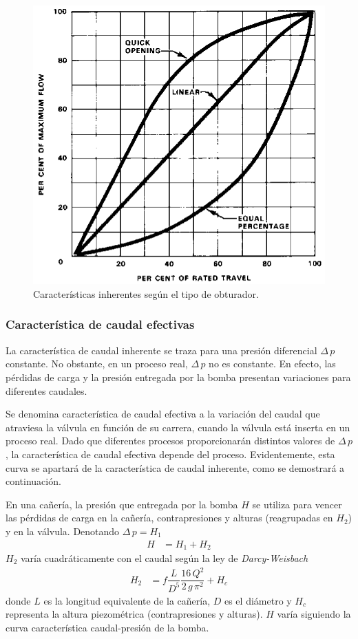 \begin{figure}
 \centering
 \includegraphics[scale=1.5]{Cap2-DisenoEnsamblado/images/Inherente.png}
 \caption{Características inherentes según el tipo de obturador.}
 \label{fig:caractInherente}
\end{figure}


\subsubsection{Característica de caudal efectivas}

La característica de caudal inherente se traza para una presión diferencial
$\Delta \,p$ constante.
No obstante, en un proceso real, $\Delta \,p$ no es constante.
En efecto, las pérdidas de carga y la presión entregada por la bomba presentan
variaciones para diferentes caudales.

Se denomina característica de caudal efectiva a la variación del
caudal que atraviesa la válvula en función de su carrera, cuando la
válvula está inserta en un proceso real.
Dado que diferentes procesos proporcionarán distintos valores de  $\Delta
\,p$, la característica de caudal efectiva depende del proceso.
Evidentemente, esta curva se apartará de la característica de caudal inherente,
como se demostrará a continuación.

En una cañería, la presión que entregada por la bomba $H$ se utiliza para
vencer las pérdidas de carga en la cañería, contrapresiones y alturas
(reagrupadas en $H_2$) y en la válvula.
Denotando $\Delta \,p = H_1$
\begin{align}
 H &= H_1 + H_2
\end{align}
$H_2$ varía cuadráticamente con el caudal según la ley de \emph{Darcy-Weisbach}
\cite{bib:Franzini}
\begin{align}
 H_2  &= f \dfrac{L}{D^5}\dfrac{16\,Q^2}{2\,g\,\pi^2} + H_c
\end{align}
donde $L$ es la longitud equivalente de la cañería, $D$ es el diámetro y $H_c$
representa la altura piezométrica (contrapresiones y alturas).
$H$ varía siguiendo la curva característica caudal-presión de la bomba.

